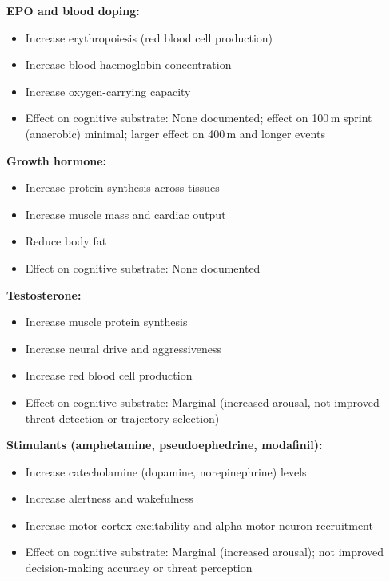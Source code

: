 \documentclass[11pt,twocolumn]{article}
\theoremstyle{definition}
\theoremstyle{remark}
\begin{document}
\textbf{EPO and blood doping:}
\begin{itemize}[leftmargin=1.2em]
\item Increase erythropoiesis (red blood cell production)
\item Increase blood haemoglobin concentration
\item Increase oxygen-carrying capacity \cite{weir1949new,levine2005measurement}
\item Effect on cognitive substrate: None documented; effect on 100\,m sprint (anaerobic) minimal; larger effect on 400\,m and longer events
\end{itemize}

\textbf{Growth hormone:}
\begin{itemize}[leftmargin=1.2em]
\item Increase protein synthesis across tissues
\item Increase muscle mass and cardiac output
\item Reduce body fat
\item Effect on cognitive substrate: None documented
\end{itemize}

\textbf{Testosterone:}
\begin{itemize}[leftmargin=1.2em]
\item Increase muscle protein synthesis
\item Increase neural drive and aggressiveness \cite{henneman1957relation}
\item Increase red blood cell production
\item Effect on cognitive substrate: Marginal (increased arousal, not improved threat detection or trajectory selection)
\end{itemize}

\textbf{Stimulants (amphetamine, pseudoephedrine, modafinil):}
\begin{itemize}[leftmargin=1.2em]
\item Increase catecholamine (dopamine, norepinephrine) levels \cite{saper2002brain,critchley2005neural}
\item Increase alertness and wakefulness
\item Increase motor cortex excitability and alpha motor neuron recruitment \cite{henneman1957relation,katz1967nerve,katz1972remarks}
\item Effect on cognitive substrate: Marginal (increased arousal); not improved decision-making accuracy or threat perception \cite{kahneman2011thinking}
\end{itemize}



\end{document}
